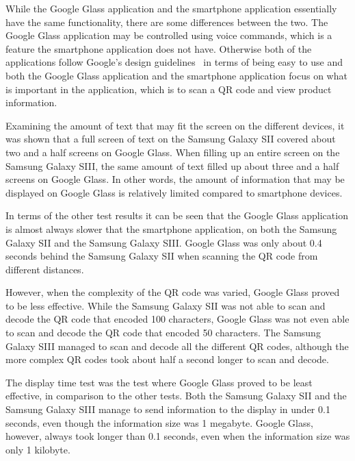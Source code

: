 While the Google Glass application and the smartphone application essentially have the same functionality, there are some differences between the two. The Google Glass application may be controlled using voice commands, which is a feature the smartphone application does not have. Otherwise both of the applications follow Google's design guidelines~\cite{androidDesignPrinciples, glassDesignPrinciples} in terms of being easy to use and both the Google Glass application and the smartphone application focus on what is important in the application, which is to scan a QR code and view product information.

Examining the amount of text that may fit the screen on the different devices, it was shown that a full screen of text on the Samsung Galaxy SII covered about two and a half screens on Google Glass. When filling up an entire screen on the Samsung Galaxy SIII, the same amount of text filled up about three and a half screens on Google Glass. In other words, the amount of information that may be displayed on Google Glass is relatively limited compared to smartphone devices.

In terms of the other test results it can be seen that the Google Glass application is almost always slower that the smartphone application, on both the Samsung Galaxy SII and the Samsung Galaxy SIII. Google Glass was only about 0.4 seconds behind the Samsung Galaxy SII when scanning the QR code from different distances.

However, when the complexity of the QR code was varied, Google Glass proved to be less effective. While the Samsung Galaxy SII was not able to scan and decode the QR code that encoded 100 characters, Google Glass was not even able to scan and decode the QR code that encoded 50 characters. The Samsung Galaxy SIII managed to scan and decode all the different QR codes, although the more complex QR codes took about half a second longer to scan and decode.

The display time test was the test where Google Glass proved to be least effective, in comparison to the other tests. Both the Samsung Galaxy SII and the Samsung Galaxy SIII manage to send information to the display in under 0.1 seconds, even though the information size was 1 megabyte. Google Glass, however, always took longer than 0.1 seconds, even when the information size was only 1 kilobyte.